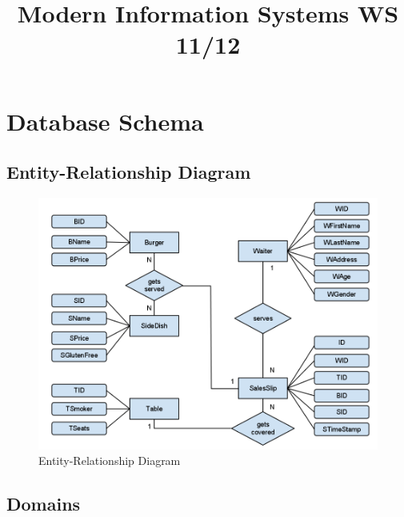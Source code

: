 \documentclass[10pt, a4paper]{article}
\author{\AuthorFront}
\date{} %
\title{Modern Information Systems WS 11/12}
\begin{document}

\newcommand{\abc}{\item[\alph{ale})]\stepcounter{ale}}
\newenvironment{liste}{\begin{itemize}}{\end{itemize}}
\newcommand{\aliste}{\begin{liste} \setcounter{ale}{1}}
\newcommand{\zliste}{\end{liste}}
\newenvironment{abcliste}{\aliste}{\zliste}


\maketitle
\thispagestyle{fancy}


\tableofcontents
\pagebreak

\section{Database Schema}

\subsection{Entity-Relationship Diagram}
\begin{figure}[htb]
	\centering
	\includegraphics[scale=0.49]{fig/entity_relationship_diagram.png}
	\caption{Entity-Relationship Diagram}
\end{figure}

\subsection{Domains}
\end{document}
